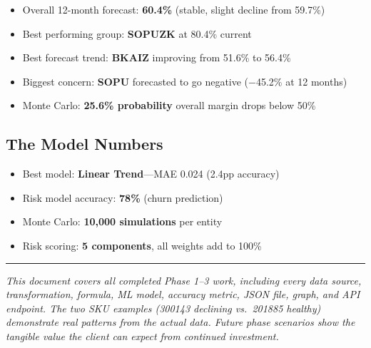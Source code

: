 \documentclass[11pt,a4paper]{article}
\newcommand{\pp}{pp}
\begin{document}
\begin{itemize}[nosep]
  \item Overall 12-month forecast: \textbf{60.4\%} (stable, slight decline from 59.7\%)
  \item Best performing group: \textbf{SOPUZK} at 80.4\% current
  \item Best forecast trend: \textbf{BKAIZ} improving from 51.6\% to 56.4\%
  \item Biggest concern: \textbf{SOPU} forecasted to go negative ($-$45.2\% at 12 months)
  \item Monte Carlo: \textbf{25.6\% probability} overall margin drops below 50\%
\end{itemize}

\subsection{The Model Numbers}

\begin{itemize}[nosep]
  \item Best model: \textbf{Linear Trend}---MAE 0.024 (2.4\pp{} accuracy)
  \item Risk model accuracy: \textbf{78\%} (churn prediction)
  \item Monte Carlo: \textbf{10{,}000 simulations} per entity
  \item Risk scoring: \textbf{5 components}, all weights add to 100\%
\end{itemize}

\vspace{1cm}
\begin{center}
\rule{0.5\textwidth}{0.4pt}
\end{center}

\vspace{0.5cm}
\noindent\textit{This document covers all completed Phase 1--3 work, including every data source, transformation, formula, ML model, accuracy metric, JSON file, graph, and API endpoint. The two SKU examples (300143 declining vs.\ 201885 healthy) demonstrate real patterns from the actual data. Future phase scenarios show the tangible value the client can expect from continued investment.}
\end{document}
